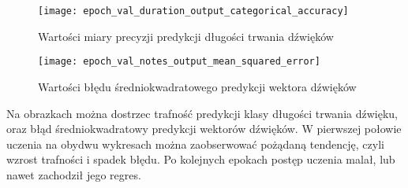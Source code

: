 {{        \begin{figure}[H]
            \centering
            \texttt{[image: epoch\_val\_duration\_output\_categorical\_accuracy]}
            \caption{Wartości miary precyzji predykcji długości trwania dźwięków}
            \label{epoch_val_duration_output_categorical_accuracy}
        \end{figure}

        \begin{figure}[H]
            \centering
            \texttt{[image: epoch\_val\_notes\_output\_mean\_squared\_error]}
            \caption{Wartości błędu średniokwadratowego predykcji wektora dźwięków}
            \label{epoch_val_notes_output_mean_squared_error}
        \end{figure}

        Na obrazkach można dostrzec trafność predykcji klasy długości trwania dźwięku, oraz błąd średniokwadratowy
        predykcji wektorów dźwięków. W pierwszej połowie uczenia na obydwu wykresach można zaobserwować pożądaną tendencję,
        czyli wzrost trafności i spadek błędu. Po kolejnych epokach postęp uczenia malał, lub nawet zachodził jego regres.
    }
}